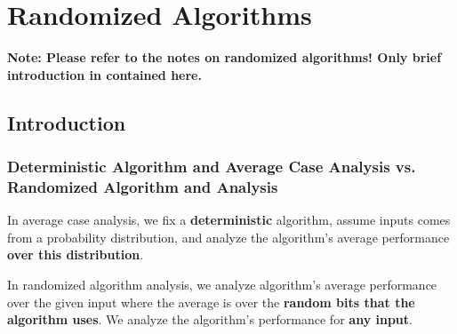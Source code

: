 \documentclass[openany]{book}
\begin{document}
\chapter{Randomized Algorithms}
\textbf{Note: Please refer to the notes on randomized algorithms! Only brief introduction in contained here.}

\section{Introduction}
\subsection{Deterministic Algorithm and Average Case Analysis vs. Randomized Algorithm and Analysis}
In average case analysis, we fix a \textbf{deterministic} algorithm, assume inputs comes from a probability distribution, and analyze the algorithm's average performance \textbf{over this distribution}.

In randomized algorithm analysis, we analyze algorithm's average performance over the given input where the average is over the \textbf{random bits that the algorithm uses}. We analyze the algorithm's performance for \textbf{any input}.
\end{document}
